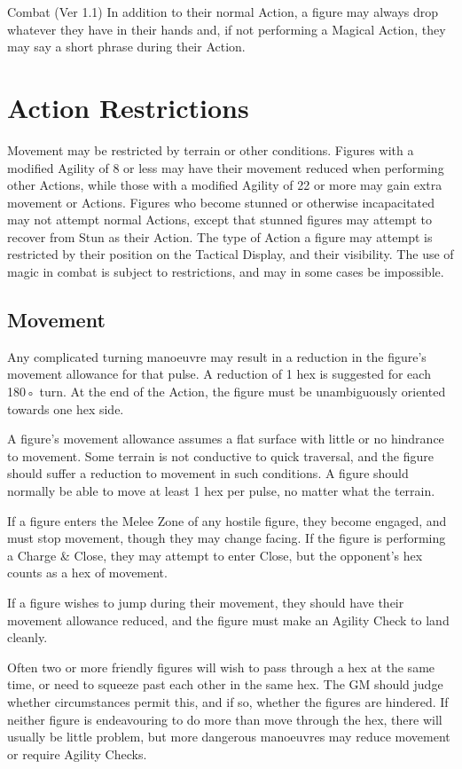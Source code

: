 \begin{Chapter}{Combat (Ver 1.1)}
In addition to their normal Action, a figure may always drop whatever
they have in their hands and, if not performing a Magical Action, they
may say a short phrase during their Action.

\section{Action Restrictions}

Movement may be restricted by terrain or other conditions. Figures
with a modified Agility of 8 or less may have their movement reduced
when performing other Actions, while those with a modified Agility of
22 or more may gain extra movement or Actions. Figures who become
stunned or otherwise incapacitated may not attempt normal Actions,
except that stunned figures may attempt to recover from Stun as their
Action.  The type of Action a figure may attempt is restricted by
their position on the Tactical Display, and their visibility. The use
of magic in combat is subject to restrictions, and may in some cases
be impossible.

\subsection{Movement}

Any complicated turning manoeuvre may result in a reduction in the
figure’s movement allowance for that pulse.  A reduction of 1 hex is
suggested for each 180◦ turn. At the end of the Action, the figure
must be unambiguously oriented towards one hex side.

A figure’s movement allowance assumes a flat surface with little or no
hindrance to movement.  Some terrain is not conductive to quick
traversal, and the figure should suffer a reduction to movement in
such conditions.  A figure should normally be able to move at least 1
hex per pulse, no matter what the terrain.

If a figure enters the Melee Zone of any hostile figure, they become
engaged, and must stop movement, though they may change facing.  If
the figure is performing a Charge \& Close, they may attempt to enter
Close, but the opponent’s hex counts as a hex of movement.

If a figure wishes to jump during their movement, they should have
their movement allowance reduced, and the figure must make an Agility
Check to land cleanly.

Often two or more friendly figures will wish to pass through a hex at
the same time, or need to squeeze past each other in the same hex.
The GM should judge whether circumstances permit this, and if so,
whether the figures are hindered.  If neither figure is endeavouring
to do more than move through the hex, there will usually be little
problem, but more dangerous manoeuvres may reduce movement or require
Agility Checks.


\end{Chapter}
